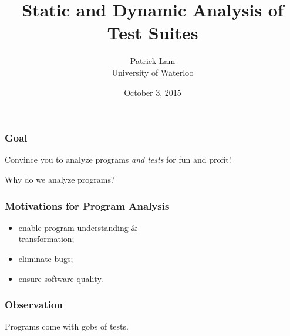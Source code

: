 \documentclass{beamer}
\title{Static and Dynamic Analysis of Test Suites}
\author{Patrick Lam\\University of Waterloo}
\date{October 3, 2015}
\newenvironment{changemargin}[1]{%
  \begin{list}{}{%
    \setlength{\topsep}{0pt}%
    \setlength{\leftmargin}{#1}%
    \setlength{\rightmargin}{1em}
    \setlength{\listparindent}{\parindent}%
    \setlength{\itemindent}{\parindent}%
    \setlength{\parsep}{\parskip}%
  }%
  \item[]}{\end{list}}
\begin{document}
\begin{frame}
  \titlepage
\end{frame}

\begin{frame}
  \frametitle{Goal}
  \Large
  \begin{changemargin}{1cm}
Convince you to analyze programs \emph{and tests} for fun and profit!
  \end{changemargin}
\end{frame}


\begin{frame}
  \centering
  \LARGE
  Why do we analyze programs?
\end{frame}

\begin{frame}
  \frametitle{Motivations for Program Analysis}
  \Large
  \begin{changemargin}{1cm}
    \begin{itemize}
    \item enable program understanding \& \\
 \hspace*{2em} transformation;
    \item eliminate bugs;
    \item ensure software quality.
    \end{itemize}
  \end{changemargin}
\end{frame}


\begin{frame}
  \frametitle{Observation}
  \centering
  \LARGE Programs come with gobs of tests.
\end{frame}
\end{document}
